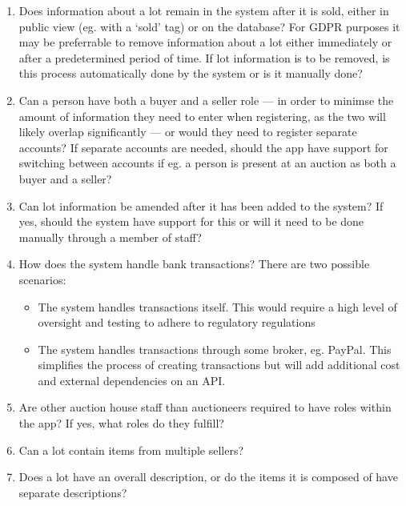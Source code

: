 \documentclass[titlepage, 12pt]{extarticle}
\begin{document}
\begin{enumerate}
\item Does information about a lot remain in the system after it is sold, either in public view (eg. with a `sold' tag) or on the database? For GDPR purposes it may be preferrable to remove information about a lot either immediately or after a predetermined period of time. If lot information is to be removed, is this process automatically done by the system or is it manually done?
\item Can a person have both a buyer and a seller role --- in order to minimse the amount of information they need to enter when registering, as the two will likely overlap significantly --- or would they need to register separate accounts? If separate accounts are needed, should the app have support for switching between accounts if eg. a person is present at an auction as both a buyer and a seller?
\item Can lot information be amended after it has been added to the system? If yes, should the system have support for this or will it need to be done manually through a member of staff?
\item How does the system handle bank transactions? There are two possible scenarios:
  \begin{itemize}
  \item The system handles transactions itself. This would require a high level of oversight and testing to adhere to regulatory regulations
  \item The system handles transactions through some broker, eg. PayPal. This simplifies the process of creating transactions but will add additional cost and external dependencies on an API. 
  \end{itemize}
\item Are other auction house staff than auctioneers required to have roles within the app? If yes, what roles do they fulfill?
\item Can a lot contain items from multiple sellers? 
\item Does a lot have an overall description, or do the items it is composed of have separate descriptions?
\end{enumerate}
\end{document}
